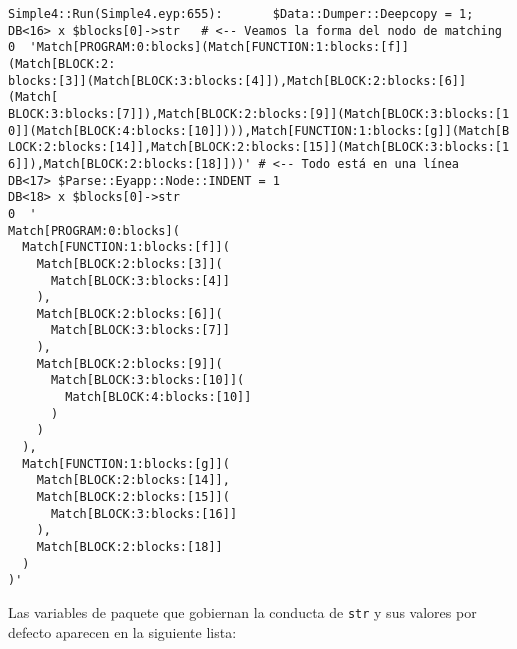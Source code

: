 \begin{verbatim}
Simple4::Run(Simple4.eyp:655):       $Data::Dumper::Deepcopy = 1;
DB<16> x $blocks[0]->str   # <-- Veamos la forma del nodo de matching
0  'Match[PROGRAM:0:blocks](Match[FUNCTION:1:blocks:[f]](Match[BLOCK:2:
blocks:[3]](Match[BLOCK:3:blocks:[4]]),Match[BLOCK:2:blocks:[6]](Match[
BLOCK:3:blocks:[7]]),Match[BLOCK:2:blocks:[9]](Match[BLOCK:3:blocks:[1
0]](Match[BLOCK:4:blocks:[10]]))),Match[FUNCTION:1:blocks:[g]](Match[B
LOCK:2:blocks:[14]],Match[BLOCK:2:blocks:[15]](Match[BLOCK:3:blocks:[1
6]]),Match[BLOCK:2:blocks:[18]]))' # <-- Todo está en una línea
DB<17> $Parse::Eyapp::Node::INDENT = 1
DB<18> x $blocks[0]->str
0  '
Match[PROGRAM:0:blocks](
  Match[FUNCTION:1:blocks:[f]](
    Match[BLOCK:2:blocks:[3]](
      Match[BLOCK:3:blocks:[4]]
    ),
    Match[BLOCK:2:blocks:[6]](
      Match[BLOCK:3:blocks:[7]]
    ),
    Match[BLOCK:2:blocks:[9]](
      Match[BLOCK:3:blocks:[10]](
        Match[BLOCK:4:blocks:[10]]
      )
    )
  ),
  Match[FUNCTION:1:blocks:[g]](
    Match[BLOCK:2:blocks:[14]],
    Match[BLOCK:2:blocks:[15]](
      Match[BLOCK:3:blocks:[16]]
    ),
    Match[BLOCK:2:blocks:[18]]
  )
)'
\end{verbatim}


Las variables de paquete que gobiernan la conducta
de \verb|str| y sus valores por defecto aparecen en la siguiente lista:

